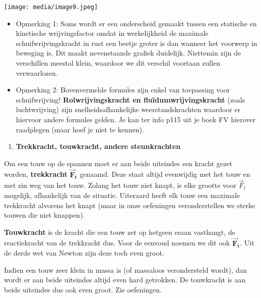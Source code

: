 \documentclass{ximera}
\newcommand{\ul}[1]{#1}
\begin{document}
\texttt{[image: media/image9.jpeg]}

\begin{itemize}
\item
  Opmerking 1: Soms wordt er een onderscheid gemaakt tussen een
  statische en kinetische wrijvingsfactor omdat in werkelijkheid de
  maximale schuifwrijvingskracht in rust een beetje groter is dan
  wanneer het voorwerp in beweging is. Dit maakt nevenstaande grafiek
  duidelijk. Niettemin zijn de verschillen meestal klein, waardoor we
  dit verschil voortaan zullen verwaarlozen.
\item
  Opmerking 2: Bovenvermelde formules zijn enkel van toepassing voor
  \ul{schuif}wrijving! \textbf{Rolwrijvingskracht en
  fluïdumwrijvingskracht} (zoals luchtwrijving) zijn
  snelheidsafhankelijke weerstandskrachten waardoor er hiervoor andere
  formules gelden. Je kan ter info p115 uit je boek FV hierover
  raadplegen (maar hoef je niet te kennen).
\end{itemize}

\begin{enumerate}
\def\labelenumi{\arabic{enumi}.}
\setcounter{enumi}{8}
\item
  \textbf{Trekkracht, touwkracht, andere steunkrachten}
\end{enumerate}

Om een touw op de spannen moet er aan beide uiteindes een kracht gezet
worden, \textbf{trekkracht}
\({\overrightarrow{\mathbf{F}}}_{\mathbf{t}}\) genaamd. Deze staat
altijd evenwijdig met het touw en met zin weg van het touw. Zolang het
touw niet knapt, is elke grootte voor \({\overrightarrow{F}}_{t}\)
mogelijk, afhankelijk van de situatie. Uiteraard heeft elk touw een
maximale trekkracht alvorens het knapt (maar in onze oefeningen
veronderstellen we sterke touwen die niet knappen).

\textbf{Touwkracht} is de kracht die een touw zet op hetgeen eraan
vasthangt, de reactiekracht van de trekkracht dus. Voor de eenvoud
noemen we dit ook \({\overrightarrow{\mathbf{F}}}_{\mathbf{t}}\). Uit de
derde wet van Newton zijn deze toch even groot.

Indien een touw zeer klein in massa is (of massaloos verondersteld
wordt), dan wordt er aan beide uiteindes altijd even hard getrokken. De
touwkracht is aan beide uiteindes dus ook even groot. Zie oefeningen.
\end{document}
